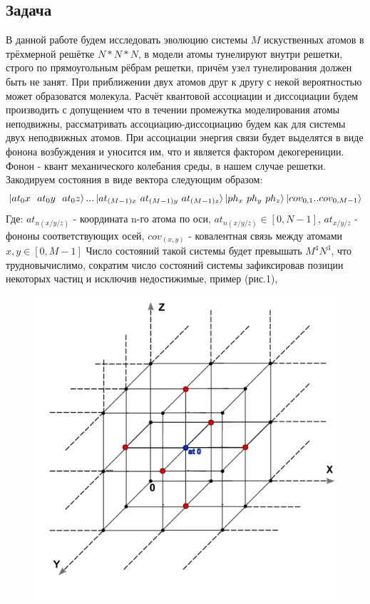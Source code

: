 \documentclass[12pt, a4paper]{article}
\begin{document}
\subsection{Задача}
\qquad В данной работе будем исследовать эволюцию системы $M$ искуственных атомов в трёхмерной решётке $N*N*N$, в модели атомы тунелируют внутри решетки, строго по прямоугольным рёбрам решетки, причём узел тунелирования должен быть не занят. При приближении двух атомов друг к другу с некой вероятностью может образоватся молекула. Расчёт квантовой ассоциации и диссоциации будем производить с допущением что в течении промежутка моделирования атомы неподвижны, рассматривать ассоциацию-диссоциацию будем как для системы двух неподвижных атомов. При ассоциации энергия связи будет выделятся в виде фонона возбуждения и уносится им, что и является фактором декогерениции. Фонон - квант механического колебания среды, в нашем случае решетки.
\newline
Закодируем состояния в виде вектора следующим образом:
\[\ket{at_0x\ \ at_0y\ \ at_0z}...\ket{at_{(M-1)x}\ at_{(M-1)y}\ at_{(M-1)z}} \ket{ph_x \ ph_y \ ph_z}\ket{cov_{0,1}..cov_{0,M-1}}\]
Где:\newline
$at_{n(x/y/z)}$ - координата n-го атома по оси, $at_{n(x/y/z)}\in[0,N-1]$,\newline
$at_{x/y/z}$ - фононы соответствующих осей, \newline 
$cov_{(x,y)}$ - ковалентная связь между атомами $x,y\in[0,M-1]$ 
\newline \null\qquad Число состояний такой системы будет превышать $M^4N^3$, что трудновычислимо, сократим число состояний системы зафиксировав позиции некоторых частиц и исключив недостижимые, пример (рис.1), 
\begin{figure}[htp]
\centering
\includegraphics[scale=10.00]{area.png}
\caption{}
\label{}
\end{figure} 
\end{document}
